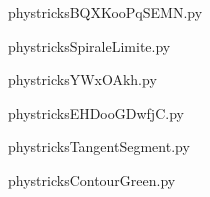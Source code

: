 
    \newcommand{\CaptionFigBQXKooPqSEMN}{<+Type your caption here+>}
    \begin{center}
        
    \end{center}
    phystricksBQXKooPqSEMN.py

    

    \clearpage
    


    \newcommand{\CaptionFigSpiraleLimite}{<+Type your caption here+>}
    \begin{center}
        
    \end{center}
    phystricksSpiraleLimite.py

    

    \clearpage
    


    \newcommand{\CaptionFigYWxOAkh}{<+Type your caption here+>}
    \begin{center}
        
    \end{center}
    phystricksYWxOAkh.py

    

    \clearpage
    


    \newcommand{\CaptionFigEHDooGDwfjC}{<+Type your caption here+>}
    \begin{center}
        
    \end{center}
    phystricksEHDooGDwfjC.py

    

    \clearpage
    


    \newcommand{\CaptionFigTangentSegment}{<+Type your caption here+>}
    \begin{center}
        
    \end{center}
    phystricksTangentSegment.py

    

    \clearpage
    


    \newcommand{\CaptionFigContourGreen}{<+Type your caption here+>}
    \begin{center}
        
    \end{center}
    phystricksContourGreen.py

